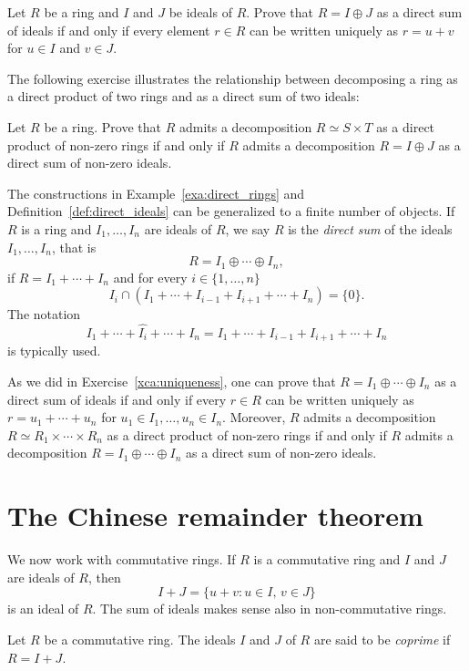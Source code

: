 \begin{exercise}
\label{xca:uniqueness}
    Let $R$ be a ring and $I$ and $J$ be ideals of $R$. 
    Prove that $R=I\oplus J$ as a direct sum of ideals if and only if 
    every element $r\in R$ can be written uniquely as 
    $r=u+v$ for $u\in I$ and $v\in J$.
\end{exercise}

The following exercise illustrates the relationship between decomposing a 
ring as a direct product of two rings and as a direct sum of two ideals:

\begin{exercise}
\label{xca:products}
    Let $R$ be a ring. Prove that $R$ admits a decomposition $R\simeq S\times
    T$ as a direct product of non-zero rings if and only if $R$ admits a
    decomposition $R=I\oplus J$ as a direct sum of non-zero ideals. 
\end{exercise}

The constructions in Example~\ref{exa:direct_rings} and
Definition~\ref{def:direct_ideals} can be generalized to a finite number of
objects.  If $R$ is a ring and $I_1,\dots,I_n$ are ideals of $R$, we say $R$ is
the \emph{direct sum} of the ideals $I_1,\dots,I_n$, that is 
\[
R=I_1\oplus\cdots\oplus I_n, 
\]
if $R=I_1+\cdots+I_n$ and 
for every $i\in\{1,\dots,n\}$
\[
I_i\cap (I_1+\cdots+I_{i-1}+I_{i+1}+\cdots+I_n)=\{0\}.
\]
The notation
\[
I_1+\cdots+\widehat{I_i}+\cdots+I_n=I_1+\cdots+I_{i-1}+I_{i+1}+\cdots+I_n
\]
is typically used. 

As we did in Exercise~\ref{xca:uniqueness}, one can prove that
$R=I_1\oplus\cdots\oplus I_n$ as a direct sum of ideals if and only if every
$r\in R$ can be written uniquely as $r=u_1+\cdots+u_n$ for $u_1\in
I_1,\dots,u_n\in I_n$. Moreover, $R$ admits a decomposition $R\simeq
R_1\times\cdots\times R_n$ as a direct product of non-zero rings if and only if
$R$ admits a decomposition $R=I_1\oplus\cdots\oplus I_n$ as a direct sum of
non-zero ideals. 

\section{The Chinese remainder theorem}

We now work with commutative rings. 
If $R$ is a commutative ring and $I$ and $J$ are ideals of $R$, then
\[
I+J=\{u+v:u\in I,\,v\in J\}
\]
is an ideal of $R$. The sum of ideals makes sense also in non-commutative rings.  

\begin{definition}
	Let $R$ be a commutative ring. The ideals $I$ and $J$ of $R$ are said to be
	\emph{coprime} if $R=I+J$.  
\end{definition}

